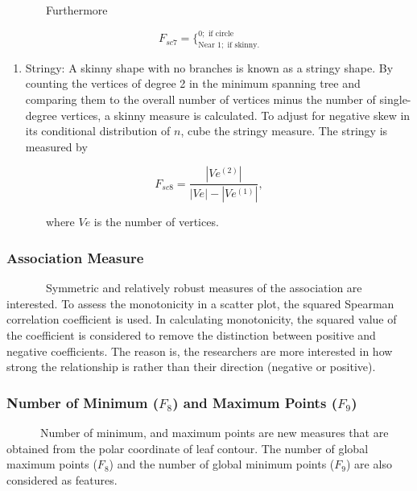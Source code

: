 \documentclass{article}
\newcommand{\tightlist}{%
\setlength{\itemsep}{0pt}\setlength{\parskip}{0pt}}
\begin{document}
~~~~~~~Furthermore

\[F_{sc7} = \Bigg\{^{0; \text{ if circle}}_{\text{Near } 1 ; \text{ if skinny}.}\]

\begin{enumerate}
\def\labelenumi{\roman{enumi})}
\setcounter{enumi}{2}
\tightlist
\item
  Stringy: A skinny shape with no branches is known as a stringy shape.
  By counting the vertices of degree 2 in the minimum spanning tree and
  comparing them to the overall number of vertices minus the number of
  single-degree vertices, a skinny measure is calculated. To adjust for
  negative skew in its conditional distribution of \(n\), cube the
  stringy measure. The stringy is measured by
\end{enumerate}

\begin{equation}
    F_{sc8} = \frac{|Ve^{(2)}|}{|Ve| - |Ve^{(1)}|},
\end{equation}

~~~~~~~where \(Ve\) is the number of vertices.

\hypertarget{association-measure}{%
\subsubsection{Association Measure}\label{association-measure}}

~~~~~~~Symmetric and relatively robust measures of the association are
interested. To assess the monotonicity in a scatter plot, the squared
  Spearman correlation coefficient is used. In calculating monotonicity,
  the squared value of the coefficient is considered to remove the
  distinction between positive and negative coefficients. The reason is,
  the researchers are more interested in how strong the relationship is
  rather than their direction (negative or positive). 




\hypertarget{number-of-minimum-f_8-and-maximum-points-f_9}{%
\subsubsection{\texorpdfstring{Number of Minimum (\(F_8\)) and Maximum
Points
(\(F_9\))}{Number of Minimum (F\_8) and Maximum Points (F\_9)}}\label{number-of-minimum-f_8-and-maximum-points-f_9}}

~~~~~~Number of minimum, and maximum points are new measures that are
obtained from the polar coordinate of leaf contour. The number of global
maximum points  ($F_8$) and the number of global
minimum points  ($F_9$) are also considered as features. 
\end{document}
